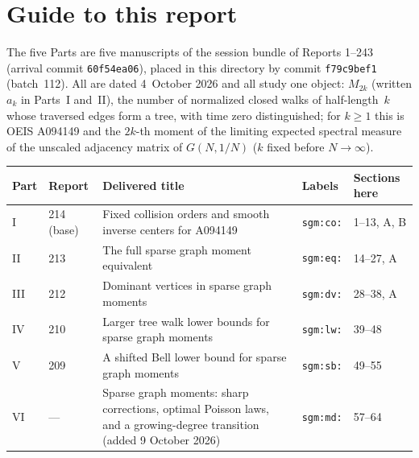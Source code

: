 \documentclass[11pt,letterpaper]{article}
\theoremstyle{remark}\newtheorem{remark}[theorem]{Remark}
\newcommand{\file}[1]{\nolinkurl{#1}}
\theoremstyle{definition}\newtheorem{definition}[theorem]{Definition}
\begin{document}
\section*{Guide to this report}\label{sgm:sec:guide}
The five Parts are five manuscripts of the session bundle of Reports
1--243 (arrival commit \file{60f54ea06}), placed in this directory by commit
\file{f79c9bef1} (batch~112). All are dated 4~October 2026 and all study
one object: $M_{2k}$ (written $a_k$ in Parts~I and~II), the number of
normalized closed walks of half-length~$k$ whose traversed edges form a
tree, with time zero distinguished; for $k\ge1$ this is OEIS A094149 and
the $2k$-th moment of the limiting expected spectral measure of the unscaled
adjacency matrix of $G(N,1/N)$ ($k$ fixed before $N\to\infty$).
\begin{center}
\small
\begin{tabular}{@{}l l >{\raggedright\arraybackslash}p{} l l@{}}
\toprule
Part & Report & Delivered title & Labels & Sections here\\
\midrule
I & 214 (base) & Fixed collision orders and smooth inverse centers for A094149 & \file{sgm:co:} & 1--13, A, B\\
II & 213 & The full sparse graph moment equivalent & \file{sgm:eq:} & 14--27, A\\
III & 212 & Dominant vertices in sparse graph moments & \file{sgm:dv:} & 28--38, A\\
IV & 210 & Larger tree walk lower bounds for sparse graph moments & \file{sgm:lw:} & 39--48\\
V & 209 & A shifted Bell lower bound for sparse graph moments & \file{sgm:sb:} & 49--55\\
VI & --- & Sparse graph moments: sharp corrections, optimal Poisson laws, and a growing-degree transition (added 9 October 2026) & \file{sgm:md:} & 57--64\\
\bottomrule
\end{tabular}
\end{center}
\end{document}
